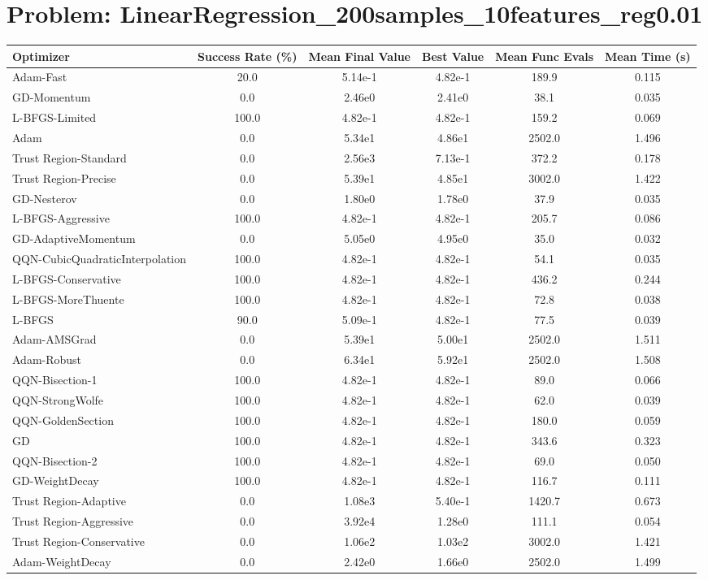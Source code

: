 \documentclass{article}
\begin{document}
\section{Problem: LinearRegression\_200samples\_10features\_reg0.01}
\begin{longtable}{p{3cm}*{5}{c}}
\toprule
\textbf{Optimizer} & \textbf{Success Rate (\%)} & \textbf{Mean Final Value} & \textbf{Best Value} & \textbf{Mean Func Evals} & \textbf{Mean Time (s)} \\
\midrule
Adam-Fast & 20.0 & 5.14e-1 & 4.82e-1 & 189.9 & 0.115 \\
GD-Momentum & 0.0 & 2.46e0 & 2.41e0 & 38.1 & 0.035 \\
L-BFGS-Limited & 100.0 & 4.82e-1 & 4.82e-1 & 159.2 & 0.069 \\
Adam & 0.0 & 5.34e1 & 4.86e1 & 2502.0 & 1.496 \\
Trust Region-Standard & 0.0 & 2.56e3 & 7.13e-1 & 372.2 & 0.178 \\
Trust Region-Precise & 0.0 & 5.39e1 & 4.85e1 & 3002.0 & 1.422 \\
GD-Nesterov & 0.0 & 1.80e0 & 1.78e0 & 37.9 & 0.035 \\
L-BFGS-Aggressive & 100.0 & 4.82e-1 & 4.82e-1 & 205.7 & 0.086 \\
GD-AdaptiveMomentum & 0.0 & 5.05e0 & 4.95e0 & 35.0 & 0.032 \\
QQN-CubicQuadraticInterpolation & 100.0 & 4.82e-1 & 4.82e-1 & 54.1 & 0.035 \\
L-BFGS-Conservative & 100.0 & 4.82e-1 & 4.82e-1 & 436.2 & 0.244 \\
L-BFGS-MoreThuente & 100.0 & 4.82e-1 & 4.82e-1 & 72.8 & 0.038 \\
L-BFGS & 90.0 & 5.09e-1 & 4.82e-1 & 77.5 & 0.039 \\
Adam-AMSGrad & 0.0 & 5.39e1 & 5.00e1 & 2502.0 & 1.511 \\
Adam-Robust & 0.0 & 6.34e1 & 5.92e1 & 2502.0 & 1.508 \\
QQN-Bisection-1 & 100.0 & 4.82e-1 & 4.82e-1 & 89.0 & 0.066 \\
QQN-StrongWolfe & 100.0 & 4.82e-1 & 4.82e-1 & 62.0 & 0.039 \\
QQN-GoldenSection & 100.0 & 4.82e-1 & 4.82e-1 & 180.0 & 0.059 \\
GD & 100.0 & 4.82e-1 & 4.82e-1 & 343.6 & 0.323 \\
QQN-Bisection-2 & 100.0 & 4.82e-1 & 4.82e-1 & 69.0 & 0.050 \\
GD-WeightDecay & 100.0 & 4.82e-1 & 4.82e-1 & 116.7 & 0.111 \\
Trust Region-Adaptive & 0.0 & 1.08e3 & 5.40e-1 & 1420.7 & 0.673 \\
Trust Region-Aggressive & 0.0 & 3.92e4 & 1.28e0 & 111.1 & 0.054 \\
Trust Region-Conservative & 0.0 & 1.06e2 & 1.03e2 & 3002.0 & 1.421 \\
Adam-WeightDecay & 0.0 & 2.42e0 & 1.66e0 & 2502.0 & 1.499 \\
\bottomrule
\end{longtable}
\end{document}
